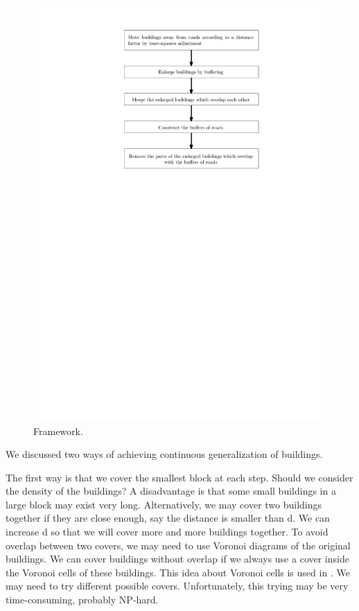 \documentclass[graybox]{svmult}
\begin{document}
\begin{figure}[tb]
	\centering
	\includegraphics{Framework}
	\caption{Framework.}
	\label{fig:Framework}
\end{figure}



We discussed two ways of achieving continuous generalization of 
buildings. 

The first way is that we cover the smallest block at each step. 
Should we consider the density of the buildings? 
A disadvantage 
is that some small buildings in a large block may exist very 
long.
Alternatively, we may cover two buildings together if they are 
close enough, say the distance is smaller than d. We can 
increase d so that we will cover more and more buildings 
together. To avoid overlap between two covers, we may need to 
use Voronoi diagrams of the original buildings. We can cover 
buildings without overlap if we always use a cover inside the 
Voronoi cells of these buildings. This idea about Voronoi cells 
is used in \textcite{vanGoethem2013}. We may need to try 
different 
possible covers. 
Unfortunately, this trying may be very time-consuming, probably 
NP-hard.
\end{document}
